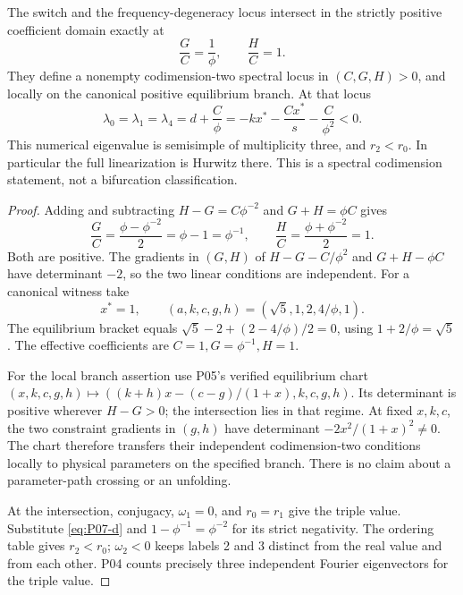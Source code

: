 \begin{proposition}
\label{prop:P07-intersection}
The switch and the frequency-degeneracy locus intersect in the strictly
positive coefficient domain exactly at
\begin{equation}
 \boxed{\frac GC=\frac1\phi,\qquad \frac HC=1.}
 \label{eq:P07-intersection}
\end{equation}
They define a nonempty codimension-two spectral locus in $(C,G,H)>0$,
and locally on the canonical positive equilibrium branch. At that locus
\begin{equation}
 \lambda_0=\lambda_1=\lambda_4=d+\frac C\phi
   =-kx^*-\frac{Cx^*}{s}-\frac{C}{\phi^2}<0.
 \label{eq:P07-triple}
\end{equation}
This numerical eigenvalue is semisimple of multiplicity three, and
$r_2<r_0$. In particular the full linearization is Hurwitz there.
This is a spectral codimension statement, not a bifurcation classification.
\end{proposition}
\begin{proof}
Adding and subtracting $H-G=C\phi^{-2}$ and $G+H=\phi C$ gives
\[
 \frac GC=\frac{\phi-\phi^{-2}}2=\phi-1=\phi^{-1},\qquad
 \frac HC=\frac{\phi+\phi^{-2}}2=1.
\]
Both are positive. The gradients in $(G,H)$ of
$H-G-C/\phi^2$ and $G+H-\phi C$ have determinant $-2$, so the
two linear conditions are independent. For a canonical witness take
\begin{equation}
 x^*=1,\qquad (a,k,c,g,h)=(\sqrt5,1,2,4/\phi,1).
 \label{eq:P07-intersection-witness}
\end{equation}
The equilibrium bracket equals $\sqrt5-2+(2-4/\phi)/2=0$,
using $1+2/\phi=\sqrt5$. The effective coefficients are
$C=1,G=\phi^{-1},H=1$.

For the local branch assertion use P05's verified equilibrium chart
$(x,k,c,g,h)\mapsto((k+h)x-(c-g)/(1+x),k,c,g,h)$.
Its determinant is positive wherever $H-G>0$; the intersection lies
in that regime. At fixed $x,k,c$, the two constraint gradients in
$(g,h)$ have determinant $-2x^2/(1+x)^2\ne0$.
The chart therefore transfers their independent codimension-two
conditions locally to physical parameters on the specified branch.
There is no claim about a parameter-path crossing or an unfolding.

At the intersection, conjugacy, $\omega_1=0$, and $r_0=r_1$
give the triple value. Substitute \eqref{eq:P07-d} and
$1-\phi^{-1}=\phi^{-2}$ for its strict negativity.
The ordering table gives $r_2<r_0$; $\omega_2<0$ keeps labels 2 and 3
distinct from the real value and from each other. P04 counts precisely
three independent Fourier eigenvectors for the triple value.
\end{proof}

